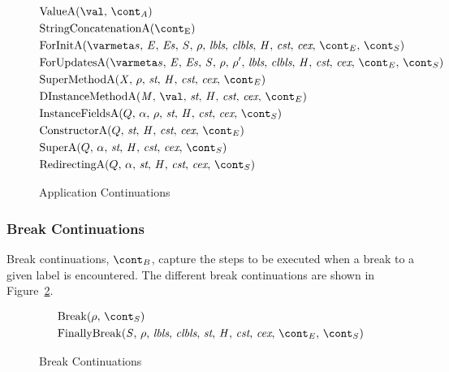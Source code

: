\documentclass[a4paper,oneside,fleqn]{article}
\begin{document}
\begin{figure}[Htp]
  \begin{eqfigure}
  \begin{align}
    &\ValueA{\val}{\acont} \label{acont:value}\\
    &\StringConcatenationA \label{acont:stringconcat}\\
    &\ForInitA{\expressionmeta} \label{acont:forinit}\\
    &\ForUpdatesA{\expressionmeta}{\env'} \label{acont:forupdates}\\
    &\SuperMethodA{\strace} \label{acont:supermethod}\\
    &\DInstanceMethodA \label{acont:staticinv}\\
    &\FieldsA{Q}{\loc}{\env}{\scont} \label{acont:fields}\\
    &\ConstructorA{Q}{\strace}{\econt} \label{acont:constructor}\\
    &\SuperA{Q}{\loc}{\scont} \label{acont:super}\\
    &\RedirectingA{Q}{\loc}{\scont} \label{acont:redirecting}
  \end{align}
  \caption{Application Continuations}
  \label{figure:acont}
  \end{eqfigure}
\end{figure}


\subsubsection{Break Continuations}
\label{subsubsec:break-continuations}

Break continuations, $\bcont$, capture the steps to be executed when a break to a given label is encountered.
The different break continuations are shown in Figure~\ref{figure:breakcont}.
\newcommand{\Break}[2]{\mathrm{Break}(#1,\,#2)}
\newcommand{\FinallyBreak}[2]{\mathrm{FinallyBreak}({#1},\,\env,\,\lbls,\,\clbls,\,\strace,\,\handler,\,\cstrace,\,\cex,\,\econt,\,{#2})}

\begin{figure}[Htp]
  \begin{eqfigure}
  \begin{align}
    &\Break{\env}{\scont} \label{breakcont:break} \\
    &\FinallyBreak{\stmt}{\scont} \label{breakcont:finallybreak}
  \end{align}
  \caption{Break Continuations}
  \label{figure:breakcont}
  \end{eqfigure}
\end{figure}
\end{document}
